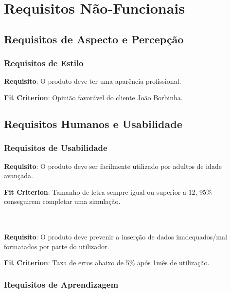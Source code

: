 \chapter{Requisitos Não-Funcionais}
\section{Requisitos de Aspecto e Percepção}
\subsection{Requisitos de Estilo}
\begin{description}
\item \textbf{Requisito}: O produto deve ter uma aparência profissional.\\

\item \textbf{Fit Criterion}: Opinião favorável do cliente João Borbinha.
\end{description}



\section{Requisitos Humanos e Usabilidade}
\subsection{Requisitos de Usabilidade}
\begin{description}
\item \textbf{Requisito}: O produto deve ser facilmente utilizado por adultos de idade avançada.\\

\item \textbf{Fit Criterion}: Tamanho de letra sempre igual ou superior a 12, 95\% conseguirem completar uma simulação.\\\\\\

\item \textbf{Requisito}: O produto deve prevenir a inserção de dados inadequados/mal formatados por parte do utilizador.\\

\item \textbf{Fit Criterion}: Taxa de erros abaixo de 5\% após 1mês de utilização.
\end{description}

\subsection{Requisitos de Aprendizagem}
